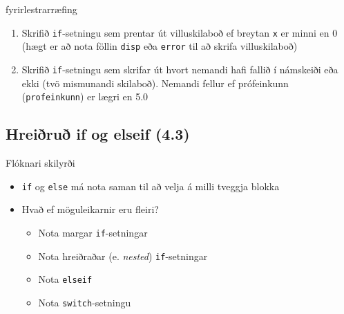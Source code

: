 \documentclass{beamer}
\begin{document}
\begin{frame}{fyrirlestrarræfing}
    \begin{enumerate}
        \item Skrifið \texttt{if}-setningu sem prentar út villuskilaboð ef breytan \texttt{x} er minni en 0 (hægt er að nota föllin \texttt{disp} eða \texttt{error} til að skrifa villuskilaboð)
        \item Skrifið \texttt{if}-setningu sem skrifar út hvort nemandi hafi fallið í námskeiði eða ekki (tvö mismunandi skilaboð).  Nemandi fellur ef prófeinkunn (\texttt{profeinkunn}) er lægri en 5.0
    \end{enumerate}
\end{frame}

\subsection{Hreiðruð if og elseif (4.3)}

\begin{frame}{Flóknari skilyrði}
\begin{itemize}
    \item \texttt{if} og \texttt{else} má nota saman til að velja á milli tveggja blokka
    \item Hvað ef möguleikarnir eru fleiri? \pause
    \begin{itemize}
        \item Nota margar \texttt{if}-setningar
        \item Nota hreiðraðar (e. \emph{nested}) \texttt{if}-setningar
        \item Nota \texttt{elseif}
        \item Nota \texttt{switch}-setningu
    \end{itemize}
\end{itemize}
\end{frame}
\end{document}
